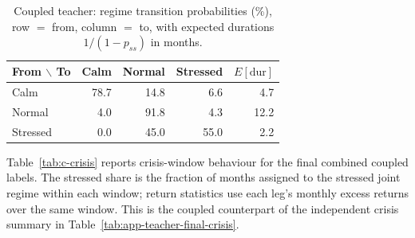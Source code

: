 \begin{table}[H]
\centering
\caption{Coupled teacher: regime transition probabilities (\%), row $=$ from, column $=$ to,
with expected durations $1/(1-p_{ss})$ in months.}
\label{tab:c-trans}
\small
\begin{tabular}{lrrrr}
\toprule
From $\backslash$ To & Calm & Normal & Stressed & $E[\text{dur}]$ \\
\midrule
Calm     & 78.7 & 14.8 & \phantom{0}6.6 & \phantom{0}4.7 \\
Normal   & \phantom{0}4.0 & 91.8 & \phantom{0}4.3 & 12.2 \\
Stressed & \phantom{0}0.0 & 45.0 & 55.0 & \phantom{0}2.2 \\
\bottomrule
\end{tabular}
\end{table}

Table~\ref{tab:c-crisis} reports crisis-window behaviour for the final combined coupled
labels. The stressed share is the fraction of months assigned to the stressed joint regime
within each window; return statistics use each leg's monthly excess returns over the same
window. This is the coupled counterpart of the independent crisis summary in
Table~\ref{tab:app-teacher-final-crisis}.

